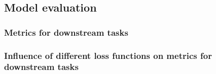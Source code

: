 \subsection{Model evaluation}
    \subsubsection{Metrics for downstream tasks}
        
    \subsubsection{Influence of different loss functions on metrics for downstream tasks}
